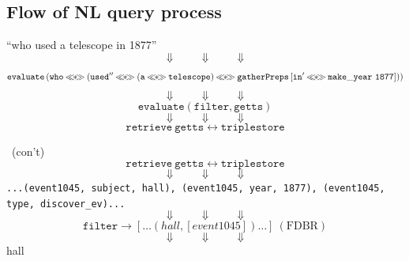 \documentclass[logoontitle,tabu,supertabular,aspectratio=43]{preney-uwindsor-beamer}
\begin{document}
    \subsection{Flow of NL query process}
    \begin{frame}{\insertsubsection}
        \centering
        ``who used a telescope in 1877''
        \[\Downarrow \qquad \Downarrow \qquad \Downarrow \]
        \[ \mathtt{evaluate} \left( \mathtt{who} \biapply \left(\mathtt{used''} \biapply \left(\mathtt{a} \biapply \mathtt{telescope}\right) \biapply \mathtt{gatherPreps} \left[ \mathtt{in'} \biapply \mathtt{make\_year}\ \mathtt{1877}\right] \right)\right)  \]
        \[\Downarrow \qquad \Downarrow \qquad \Downarrow \]
        \[\mathtt{evaluate} \left(\mathtt{filter},\mathtt{getts}\right) \]
        \[\Downarrow \qquad \Downarrow \qquad \Downarrow \]
        \[\mathtt{retrieve}\ \mathtt{getts} \longleftrightarrow \mathtt{triplestore} \]

    \end{frame}

    \begin{frame}{\insertsubsection\ (con't)}
        \centering
        \[\mathtt{retrieve}\ \mathtt{getts} \longleftrightarrow \mathtt{triplestore} \]
        \[\Downarrow \qquad \Downarrow \qquad \Downarrow \]
        \texttt{...(event1045, subject, hall), (event1045, year, 1877), (event1045, type, discover\_ev)...}
        \[\Downarrow \qquad \Downarrow \qquad \Downarrow \]
        \[\mathtt{filter} \longrightarrow \left[\ldots\left(hall, \left[event1045\right]\right)\ldots\right]\ \mathrm{(FDBR)}\]
        \[\Downarrow \qquad \Downarrow \qquad \Downarrow \]
        hall
    \end{frame}
\end{document}
